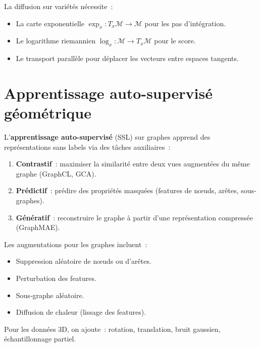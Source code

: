 \begin{attention}[title=\textbf{Difficult\'es techniques}]
La diffusion sur vari\'et\'es n\'ecessite~:
\begin{itemize}
  \item La carte exponentielle $\exp_x : T_x\mathcal{M} \to
        \mathcal{M}$ pour les pas d'int\'egration.
  \item Le logarithme riemannien $\log_x : \mathcal{M} \to
        T_x\mathcal{M}$ pour le score.
  \item Le transport parall\`ele pour d\'eplacer les vecteurs
        entre espaces tangents.
\end{itemize}
\end{attention}

\section{Apprentissage auto-supervis\'e g\'eom\'etrique}
\label{sec:ssl_geometrique}

\begin{definition}
L'\textbf{apprentissage auto-supervis\'e} (SSL) sur graphes
apprend des repr\'esentations sans labels via des t\^aches
auxiliaires~:
\begin{enumerate}
  \item \textbf{Contrastif}~: maximiser la similarit\'e entre
        deux vues augment\'ees du m\^eme graphe (GraphCL, GCA).
  \item \textbf{Pr\'edictif}~: pr\'edire des propri\'et\'es
        masqu\'ees (features de n\oe uds, ar\^etes, sous-graphes).
  \item \textbf{G\'en\'eratif}~: reconstruire le graphe \`a
        partir d'une repr\'esentation compress\'ee (GraphMAE).
\end{enumerate}
\end{definition}

\begin{proposition}
Les augmentations pour les graphes incluent~:
\begin{itemize}
  \item Suppression al\'eatoire de n\oe uds ou d'ar\^etes.
  \item Perturbation des features.
  \item Sous-graphe al\'eatoire.
  \item Diffusion de chaleur (lissage des features).
\end{itemize}
Pour les donn\'ees 3D, on ajoute~: rotation, translation,
bruit gaussien, \'echantillonnage partiel.
\end{proposition}

